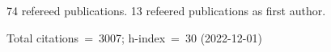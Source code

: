 74 refereed publications. 13 refeered publications as first author.

Total citations~=~3007; h-index~=~30 (2022-12-01)